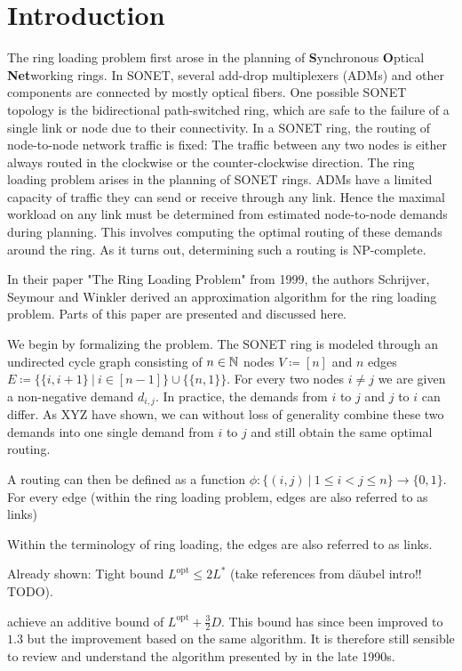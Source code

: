 \section{Introduction}

The ring loading problem first arose in the planning of \textbf{S}ynchronous \textbf{O}ptical \textbf{Net}working rings.
In SONET, several add-drop multiplexers (ADMs) and other components are connected by mostly optical fibers.
One possible SONET topology is the bidirectional path-switched ring, which are safe to the failure of a single link or node due to their connectivity.
In a SONET ring, the routing of node-to-node network traffic is fixed: The traffic between any two nodes is either always routed in the clockwise or the counter-clockwise direction.
The ring loading problem arises in the planning of SONET rings.
ADMs have a limited capacity of traffic they can send or receive through any link.
Hence the maximal workload on any link must be determined from estimated node-to-node demands during planning.
This involves computing the optimal routing of these demands around the ring.
As it turns out, determining such a routing is NP-complete.

In their paper "The Ring Loading Problem" from 1999, the authors Schrijver, Seymour and Winkler \cite{schrijver99} derived an approximation algorithm for the ring loading problem.
Parts of this paper are presented and discussed here.

We begin by formalizing the problem.
The SONET ring is modeled through an undirected cycle graph consisting of $n \in \mathbb{N}$ nodes $V \coloneqq [n]$ and $n$ edges $E \coloneqq \{\{i, i+1\}\ |\ i \in [n-1]\} \cup \{\{n, 1\}\}$.
For every two nodes $i \neq j$ we are given a non-negative demand $d_{i, j}$.
In practice, the demands from $i$ to $j$ and $j$ to $i$ can differ.
As XYZ have shown, we can without loss of generality combine these two demands into one single demand from $i$ to $j$ and still obtain the same optimal routing.

A routing can then be defined as a function $\phi: \{(i, j)\ | \ 1 \leq i < j \leq n\} \rightarrow \{0, 1\}$.
For every edge (within the ring loading problem, edges are also referred to as links)  

Within the terminology of ring loading, the edges are also referred to as links.


Already shown: Tight bound $L^\mathrm{opt} \leq 2 L^\ast$ (take references from däubel intro!! TODO).

\citet{schrijver99} achieve an additive bound of $L^\mathrm{opt} + \frac{3}{2}D$.
This bound has since been improved to $1.3$ but the improvement based on the same algorithm.
It is therefore still sensible to review and understand the algorithm presented by \citet{schrijver99} in the late 1990s.

